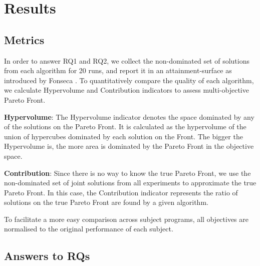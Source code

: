 
\section{Results}
\label{sec_results}
\subsection{Metrics}
\label{sec_matrics}

In order to answer RQ1 and RQ2, we collect the non-dominated set of solutions from each algorithm for 20 runs, and report it in an attainment-surface as introduced by Fonseca \cite{attainment_surface:1996}. To quantitatively compare the quality of each algorithm, we calculate Hypervolume and Contribution indicators to assess multi-objective Pareto Front.

\textbf{Hypervolume}: The Hypervolume indicator \cite{797969} denotes the space dominated by any of the solutions on the Pareto Front. It is calculated as the hypervolume of the union of hypercubes dominated by each solution on the Front. The bigger the Hypervolume is, the more area is dominated by the Pareto Front in the objective space.

\textbf{Contribution}: Since there is no way to know the true Pareto Front, we use the non-dominated set of joint solutions from all experiments to approximate the true Pareto Front. In this case, the Contribution indicator represents the ratio of solutions on the true Pareto Front are found by a given algorithm.


To facilitate a more easy comparison across subject programs, all objectives are normalised to the original performance of each subject.

\subsection{Answers to RQs}
\label{sec_answers}

\newcommand{\shallow}{Sha}
\newcommand{\all}{All}
\newcommand{\randomsearch}{Rand}
\newcommand{\nsgaii}{NSGA}
\newcommand{\sr}{\emph{\shallow\randomsearch}}
\newcommand{\sn}{\emph{\shallow\nsgaii}}
\newcommand{\dr}{\emph{\all\randomsearch}}
\newcommand{\dn}{\emph{\all\nsgaii}}


